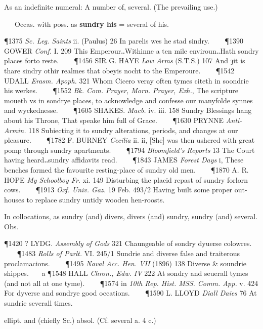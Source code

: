 \begin{description}[wide, labelwidth=!, labelindent=0pt]
\begin{myenumerate}
 As an indefinite numeral: A number of, several. (The prevailing use.)

\noindent   Occas. with poss. as \textbf{sundry his} = several of his.

\P 1375 \textit{Sc. Leg.  Saints} ii. (Paulus) 26 In parelis wes he stad sindry.    
\P 1390 GOWER  \textit{Conf.} I. 209 This Emperour‥Withinne a ten mile enviroun‥Hath sondry places forto reste.    
\P 1456 SIR G. HAYE  \textit{Law Arms} (S.T.S.) 107 And ȝit is thare sindry othir realmes that obeyis nocht to the Emperoure.    
\P 1542 UDALL  \textit{Erasm. Apoph.} 321 Whom Cicero veray often tymes citeth in soondrie his werkes.    
\P 1552  \textit{Bk. Com. Prayer, Morn. Prayer, Exh.}, The scripture moueth vs in sondrye places, to acknowledge and confesse our manyfolde synnes and wyckednesse.    
\P 1605 SHAKES.  \textit{Macb.} iv. iii. 158 Sundry Blessings hang about his Throne, That speake him full of Grace.    
\P 1630 PRYNNE  \textit{Anti-Armin.} 118 Subiecting it to sundry alterations, periods, and changes at our pleasure.    
\P 1782 F. BURNEY  \textit{Cecilia} ii. ii, [She] was then ushered with great pomp through sundry apartments.    
\P 1794 \textit{Bloomfield's  Reports} 13 The Court having heard‥sundry affidavits read.    
\P 1843 JAMES  \textit{Forest Days} i, These benches formed the favourite resting-place of sundry old men.    
\P 1870 A. R. HOPE  \textit{My Schoolboy Fr.} xi. 149 Disturbing the placid repast of sundry forlorn cows.    
\P 1913  \textit{Oxf. Univ. Gaz.} 19 Feb. 493/2 Having built some proper out-houses to replace sundry untidy wooden hen-roosts.

 In collocations, as sundry (and) divers, divers (and) sundry, sundry (and) several. Obs.

\P 1420 ? LYDG. \textit{Assembly of Gods} 321 Chaungeable of sondry dyuerse colowres.    
\P 1483 \textit{Rolls  of Parlt.} VI. 245/1 Sundrie and diverse false and traiterous proclamacions.    
\P 1495 \textit{Naval  Acc. Hen. VII} (1896) 138 Diverse \& soundrie shippes.    a 
\P 1548 HALL  \textit{Chron., Edw. IV} 222 At sondry and seuerall tymes (and not all at one tyme).    
\P 1574 in  \textit{10th Rep. Hist. MSS. Comm. App.} v. 424 For dyverse and sondrye good occations.    
\P 1590 L. LLOYD  \textit{Diall Daies} 76 At sundrie severall times.

 ellipt. and (chiefly Sc.) absol. (Cf. several a. 4 c.)


\end{myenumerate}
\end{description}

